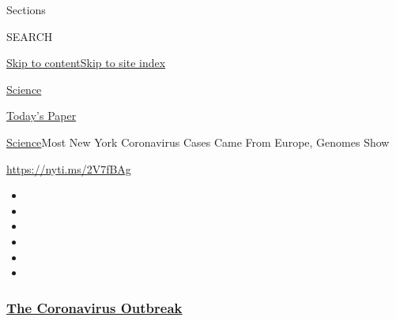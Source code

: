 Sections

SEARCH

\protect\hyperlink{site-content}{Skip to
content}\protect\hyperlink{site-index}{Skip to site index}

\href{https://www.nytimes3xbfgragh.onion/section/science}{Science}

\href{https://myaccount.nytimes3xbfgragh.onion/auth/login?response_type=cookie\&client_id=vi}{}

\href{https://www.nytimes3xbfgragh.onion/section/todayspaper}{Today's
Paper}

\href{/section/science}{Science}\textbar{}Most New York Coronavirus
Cases Came From Europe, Genomes Show

\url{https://nyti.ms/2V7fBAg}

\begin{itemize}
\item
\item
\item
\item
\item
\item
\end{itemize}

\hypertarget{the-coronavirus-outbreak}{%
\subsubsection{\texorpdfstring{\href{https://www.nytimes3xbfgragh.onion/news-event/coronavirus?name=styln-coronavirus-national\&region=TOP_BANNER\&variant=undefined\&block=storyline_menu_recirc\&action=click\&pgtype=Article\&impression_id=8ad2df20-e391-11ea-bdea-b32ca169ebf5}{The
Coronavirus
Outbreak}}{The Coronavirus Outbreak}}\label{the-coronavirus-outbreak}}

